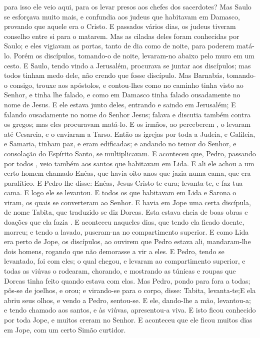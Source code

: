 {{} para isso
{} ele veio aqui, para os levar presos aos chefes dos sacerdotes?
  Mas Saulo se esforçava muito mais, e confundia aos judeus que habitavam em Damasco, provando que aquele era o Cristo.
  E passados vários dias, os judeus tiveram conselho entre si para o matarem.
  Mas as ciladas deles foram conhecidas por Saulo; e eles vigiavam as portas, tanto de dia como de noite, para poderem matá-lo.
  Porém os discípulos, tomando-o de noite, levaram-no abaixo pelo muro em um cesto.
  E Saulo, tendo vindo a Jerusalém, procurava se juntar aos discípulos; mas todos tinham medo dele, não crendo que fosse discípulo.
  Mas Barnabás, tomando-o consigo, trouxe
{} aos apóstolos, e contou-lhes como no caminho tinha visto ao Senhor, e tinha lhe falado, e como em Damasco tinha falado ousadamente no nome de Jesus.
  E ele estava junto deles, entrando e saindo em Jerusalém;
  E falando ousadamente no nome do Senhor Jesus; falava e discutia também contra os gregos; mas eles procuravam matá-lo.
  E os irmãos, ao perceberem
{},  o levaram até Cesareia, e o enviaram a Tarso.
  Então as igrejas por toda a Judeia, e Galileia, e Samaria, tinham paz, e eram edificadas; e andando no temor do Senhor, e
{} consolação do Espírito Santo, se multiplicavam.
  E aconteceu que, Pedro, passando por todos
{},  veio também aos santos que habitavam em Lida.
  E ali ele achou a um certo homem chamado Enéas, que havia oito anos que jazia numa cama, que era paralítico.
  E Pedro lhe disse: Enéas, Jesus Cristo te cura; levanta-te, e faz tua cama. E logo ele se levantou.
  E todos os que habitavam em Lida e Sarona o viram, os quais se converteram ao Senhor.
  E havia em Jope uma certa discípula, de nome Tabita, que traduzido se diz Dorcas.
 Esta estava cheia de boas obras e doações que ela fazia
{} .
  E aconteceu naqueles dias, que tendo ela ficado doente, morreu; e tendo a lavado, puseram-na no compartimento superior.
  E como Lida era perto de Jope, os discípulos, ao ouvirem que Pedro estava ali, mandaram-lhe dois homens, rogando
{} que não demorasse a vir a eles.
  E Pedro, tendo se levantado, foi com eles; o qual chegou, e
{} levaram ao compartimento superior, e todas as viúvas o rodearam, chorando, e mostrando
{} as túnicas e roupas que Dorcas tinha feito quando estava com elas.
  Mas Pedro, pondo para fora a todas; pôs-se de joelhos, e orou; e virando-se para o corpo, disse: Tabita, levanta-te;E ela abriu seus olhos, e vendo a Pedro, sentou-se.
  E ele, dando-lhe a mão, levantou-a; e tendo chamado aos santos, e às viúvas, apresentou-a viva.
  E isto ficou conhecido por toda Jope, e muitos creram no Senhor.
  E aconteceu que ele ficou muitos dias em Jope, com um certo Simão curtidor.
\par }

